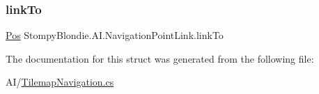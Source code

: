 \subsubsection{\texorpdfstring{link\+To}{linkTo}}
{\footnotesize\ttfamily \mbox{\hyperlink{struct_stompy_blondie_1_1_common_1_1_types_1_1_pos}{Pos}} Stompy\+Blondie.\+A\+I.\+Navigation\+Point\+Link.\+link\+To}



The documentation for this struct was generated from the following file\+:\begin{DoxyCompactItemize}
\item 
A\+I/\mbox{\hyperlink{_tilemap_navigation_8cs}{Tilemap\+Navigation.\+cs}}\end{DoxyCompactItemize}

